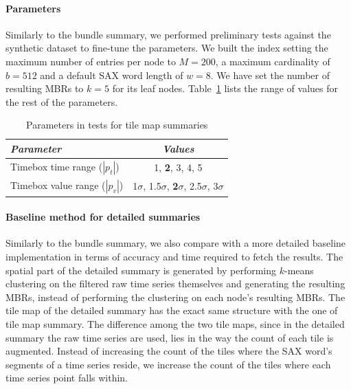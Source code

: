 \label{subsubsec:tilemap_sum_benchmarking}

\paragraph{Parameters} Similarly to the bundle summary, we performed preliminary tests against the synthetic dataset to fine-tune the parameters. We built the \hisax index setting the maximum number of entries per node to $M=200$, a maximum cardinality of $b=512$ and a default SAX word length of $w=8$. We have set the number of resulting MBRs to $k = 5$ for its leaf nodes. Table~\ref{tab:parameters2} lists the range of values for the rest of the parameters.

\begin{table}[!ht]
\centering
\caption{Parameters in tests for tile map summaries}
\begin{footnotesize}
\begin{tabular}{lc} 
\hline
{\em Parameter} &{\em Values} \\
\hline
Timebox time range ($|p_t|$) & 1, {\bf 2}, 3, 4, 5 \\
Timebox value range ($|p_v|$) & 1$\sigma$, 1.5$\sigma$, {\bf 2$\sigma$}, 2.5$\sigma$, 3$\sigma$ \\
\hline
\end{tabular}
\end{footnotesize}
\label{tab:parameters2}
\end{table}
\vspace{-7.5pt}

\paragraph{Baseline method for detailed summaries} 
Similarly to the bundle summary, we also compare with a more detailed baseline implementation in terms of accuracy and time required to fetch the results. The spatial part of the detailed summary is generated by performing $k$-means clustering on the filtered raw time series themselves and generating the resulting MBRs, instead of performing the clustering on each node's resulting MBRs. The tile map of the detailed summary has the exact same structure with the one of tile map summary. The difference among the two tile maps, since in the detailed summary the raw time series are used, lies in the way the count of each tile is augmented. Instead of increasing the count of the tiles where the SAX word's segments of a time series reside, we increase the count of the tiles where each time series point falls within.
 

